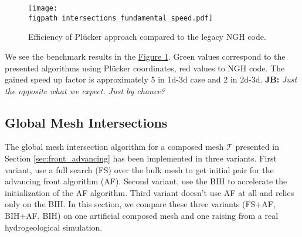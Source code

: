 \documentclass{elsarticle}
\newcommand{\fig}[1]{\hyperref[#1]{Figure \ref{#1}}}
\newcommand{\figpath}{figures/}
\newcommand{\noteJB}[1]{{\color{Blue} \textbf{JB: } \textit{#1}}}
\newcommand{\notePE}[1]{{\color{Orange} \textbf{PE: } \textit{#1}}}
\newcommand{\plucker}{Pl\"{u}cker }
\newcommand{\ngh}{NGH }
\begin{document}
\begin{figure}[!htb]
    \centering
    \texttt{[image: \\figpath intersections\_fundamental\_speed.pdf]}
    \caption{Efficiency of \plucker approach compared to the legacy \ngh code.}
    \label{fig:fundamental_speed}
\end{figure}

We see the benchmark results in the \fig{fig:fundamental_speed}. Green values correspond to the presented algorithms
using \plucker coordinates, red values to \ngh code. The gained speed up factor is approximately 5 in 1d-3d case and 2 in 2d-3d. 
\noteJB{Just the opposite what we expect. Just by chance?}

\subsection{Global Mesh Intersections}
The global mesh intersection algorithm for a composed mesh $\mathcal T$ presented in Section \ref{sec:front_advancing} has been
implemented in three variants. First variant, use a full search (FS) over the bulk mesh to get initial pair for the advancing front algorithm (AF).
Second variant, use the BIH to accelerate the initialization of the AF algorithm. Third variant doesn't use AF at all and relies only on the BIH. 
In this section, we compare these three variants (FS+AF, BIH+AF, BIH) on one artificial composed mesh and one raising from a real hydrogeological simulation.

% 
\end{document}
